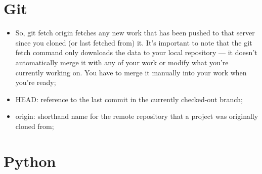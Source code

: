 \section{Git}

\begin{itemize}
    \item So, git fetch origin fetches any new work that has been pushed to that server since you cloned (or last fetched from) it. It’s important to note that the git fetch command only downloads
    the data to your local repository — it doesn’t automatically merge it with any of your work or modify what you’re currently working on. You have to merge it manually into your work when you’re ready;
    
    \item HEAD: reference to the last commit in the currently checked-out branch;
    
    \item origin: shorthand name for the remote repository that a project was originally cloned from;
\end{itemize}

\section{Python}

